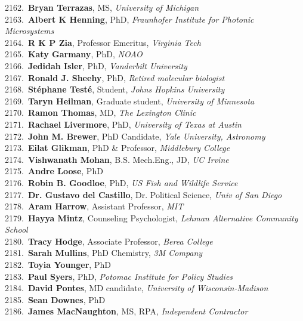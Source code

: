 2162.~{\bf Bryan Terrazas}, MS, {\sl University of Michigan} \\
2163.~{\bf Albert K Henning}, PhD, {\sl Fraunhofer Institute for Photonic Microsystems} \\
2164.~{\bf R K P Zia}, Professor Emeritus, {\sl Virginia Tech} \\
2165.~{\bf Katy Garmany}, PhD, {\sl NOAO} \\
2166.~{\bf Jedidah Isler}, PhD, {\sl Vanderbilt University} \\
2167.~{\bf Ronald J. Sheehy}, PhD, {\sl Retired molecular biologist} \\
2168.~{\bf St\'{e}phane Test\'{e}}, Student, {\sl Johns Hopkins University} \\
2169.~{\bf Taryn Heilman}, Graduate student, {\sl University of Minnesota} \\
2170.~{\bf Ramon Thomas}, MD, {\sl The Lexington Clinic} \\
2171.~{\bf Rachael Livermore}, PhD, {\sl University of Texas at Austin} \\
2172.~{\bf John M. Brewer}, PhD Candidate, {\sl Yale University, Astronomy} \\
2173.~{\bf Eilat Glikman}, PhD \& Professor, {\sl Middlebury College} \\
2174.~{\bf Vishwanath Mohan}, B.S. Mech.Eng., JD, {\sl UC Irvine} \\
2175.~{\bf Andre Loose}, PhD \\
2176.~{\bf Robin B. Goodloe},  PhD, {\sl US Fish and Wildlife Service} \\
2177.~{\bf Dr. Gustavo del Castillo}, Dr. Political Science, {\sl Univ of San Diego} \\
2178.~{\bf Aram Harrow}, Assistant Professor, {\sl MIT} \\
2179.~{\bf Hayya Mintz}, Counseling Psychologist, {\sl Lehman Alternative Community School} \\
2180.~{\bf Tracy Hodge}, Associate Professor, {\sl Berea College} \\
2181.~{\bf Sarah Mullins}, PhD Chemistry, {\sl 3M Company} \\
2182.~{\bf Toyia Younger}, PhD \\
2183.~{\bf Paul Syers}, PhD, {\sl Potomac Institute for Policy Studies } \\
2184.~{\bf David Pontes}, MD candidate, {\sl University of Wisconsin-Madison} \\
2185.~{\bf Sean Downes}, PhD \\
2186.~{\bf James MacNaughton}, MS, RPA, {\sl Independent Contractor} \\
